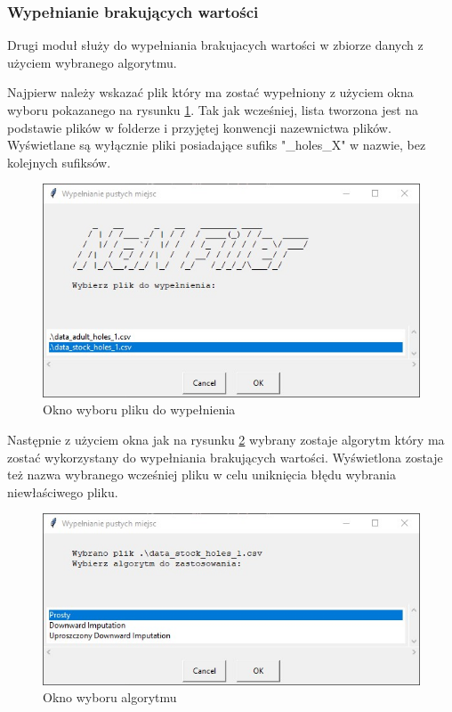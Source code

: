 \documentclass[12pt,twoside]{article}
\begin{document}
\subsubsection{Wypełnianie brakujących wartości}

Drugi moduł służy do wypełniania brakujacych wartości w zbiorze danych z użyciem wybranego algorytmu. 

Najpierw należy wskazać plik który ma zostać wypełniony z użyciem okna wyboru pokazanego na rysunku \ref{Fig:fill_file}.
Tak jak wcześniej, lista tworzona jest na podstawie plików w folderze i przyjętej konwencji nazewnictwa plików.
Wyświetlane są wyłącznie pliki posiadające sufiks "\_holes\_X" w nazwie, bez kolejnych sufiksów.

\begin{figure}[ht]
	\centering
	\includegraphics[width=12cm]{img/05.jpg}
	\caption{Okno wyboru pliku do wypełnienia}
\label{Fig:fill_file}
\end{figure}

Następnie z użyciem okna jak na rysunku \ref{Fig:fill_alg}
wybrany zostaje algorytm który ma zostać wykorzystany do wypełniania brakujących wartości.
Wyświetlona zostaje też nazwa wybranego wcześniej pliku w celu uniknięcia błędu wybrania niewłaściwego pliku.

\begin{figure}[ht]
	\centering
	\includegraphics[width=12cm]{img/06.jpg}
	\caption{Okno wyboru algorytmu}
\label{Fig:fill_alg}
\end{figure}
\end{document}
